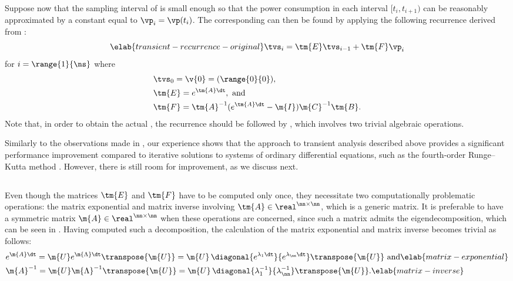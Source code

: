 Suppose now that the sampling interval \dt of \mp is small enough so that the
power consumption in each interval $[t_i, t_{i + 1})$ can be reasonably
approximated by a constant equal to $\vp_i = \vp(t_i)$. The corresponding \mq
can then be found by applying the following recurrence derived from
:
\begin{equation} \elab{transient-recurrence-original}
  \tvs_{i} = \tm{E} \tvs_{i - 1} + \tm{F} \vp_i
\end{equation}
for $i = \range{1}{\ns}$ where
\begin{align*}
  & \tvs_0 = \v{0} = (\range{0}{0}), \\
  & \tm{E} = e^{\tm{A} \dt}, \text{ and} \\
  & \tm{F} = \tm{A}^{-1}(e^{\tm{A} \dt} - \m{I})\m{C}^{-1} \tm{B}.
\end{align*}
Note that, in order to obtain the actual \mq, the recurrence should be followed
by , which involves two trivial algebraic
operations.

Similarly to the observations made in \cite{thiele2011, pagani2015}, our
experience shows that the approach to transient analysis described above
provides a significant performance improvement compared to iterative solutions
to systems of ordinary differential equations, such as the fourth-order
Runge--Kutta method \cite{press2007}. However, there is still room for
improvement, as we discuss next.

\subsection{\solutiontitle}

Even though the matrices $\tm{E}$ and $\tm{F}$ have to be computed only once,
they necessitate two computationally problematic operations: the matrix
exponential and matrix inverse involving $\tm{A} \in \real^{\nn \times \nn}$,
which is a generic matrix. It is preferable to have a symmetric matrix $\m{A}
\in \real^{\nn \times \nn}$ when these operations are concerned, since such a
matrix admits the eigendecomposition, which can be seen in
. Having computed such a decomposition, the calculation
of the matrix exponential and matrix inverse becomes trivial as follows:
\begin{align}
  & e^{\m{A} \dt}
  = \m{U} e^{\m{\Lambda} \dt} \transpose{\m{U}}
  = \m{U} \, \diagonal{e^{\lambda_1 \dt}}{e^{\lambda_\nn \dt}} \transpose{\m{U}} \text{ and} \elab{matrix-exponential} \\
  & \m{A}^{-1}
  = \m{U} \m{\Lambda}^{-1} \transpose{\m{U}}
  = \m{U} \, \diagonal{\lambda_1^{-1}}{\lambda_\nn^{-1}} \transpose{\m{U}}. \elab{matrix-inverse}
\end{align}

